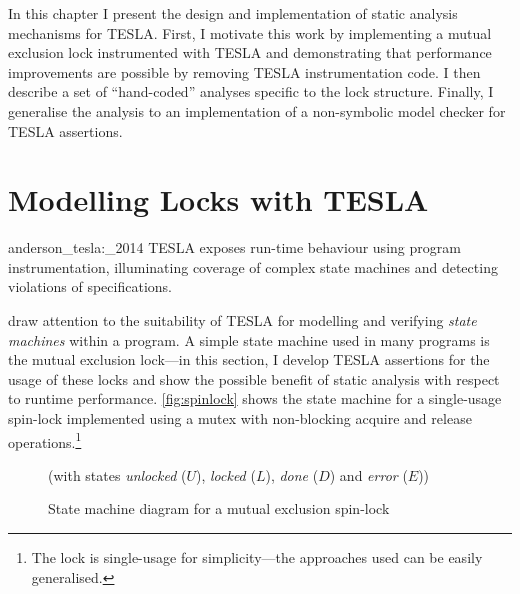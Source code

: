 In this chapter I present the design and implementation of static analysis
mechanisms for TESLA. First, I motivate this work by implementing a mutual
exclusion lock instrumented with TESLA and demonstrating that performance
improvements are possible by removing TESLA instrumentation code. I then
describe a set of ``hand-coded'' analyses specific to the lock structure.
Finally, I generalise the analysis to an implementation of a non-symbolic model
checker for TESLA assertions.

\section{Modelling Locks with TESLA} \label{sec:locks}

\begin{displaycquote}[p. 1]{anderson_tesla:_2014}
TESLA exposes run-time behaviour using program instrumentation, illuminating
coverage of complex state machines and detecting violations of specifications.
\end{displaycquote}

\textcite{anderson_tesla:_2014} draw attention to the suitability of TESLA for
modelling and verifying \emph{state machines} within a program. A simple state
machine used in many programs is the mutual exclusion lock---in this section, I
develop TESLA assertions for the usage of these locks and show the possible
benefit of static analysis with respect to runtime performance.
\autoref{fig:spinlock} shows the state machine for a single-usage spin-lock
implemented using a mutex with non-blocking acquire and release
operations.\footnote{The lock is single-usage for simplicity---the approaches
used can be easily generalised.}

\begin{figure}
  \centering
  \caption{State machine diagram for a mutual exclusion spin-lock}{(with
  states \emph{unlocked} ($U$), \emph{locked} ($L$),
  \emph{done} ($D$) and \emph{error} ($E$))}
  \label{fig:spinlock}
\end{figure}

